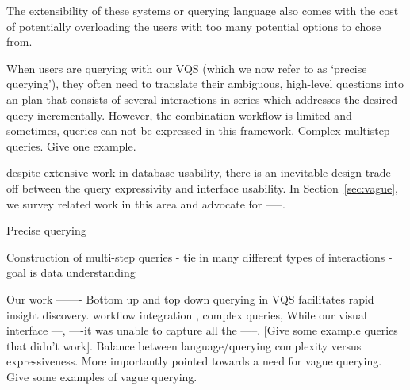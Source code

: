 The extensibility of these systems or querying language also comes with the cost of potentially overloading the users with too many potential options to chose from. 

\par When users are querying with our VQS (which we now refer to as `precise querying'), they often need to translate their ambiguous, high-level questions into an plan that consists of several interactions in series which addresses the desired query incrementally. However, the combination workflow is limited and sometimes, queries can not be expressed in this framework. Complex multistep queries. Give one example. 
\par despite extensive work in database usability, there is an inevitable design trade-off between the query expressivity and interface usability\cite{Morton2014,Jagadish2007}. In Section~\ref{sec:vague}, we survey related work in this area and advocate for -----. 


Precise querying 

Construction of multi-step queries
- tie in many different types of interactions
- goal is data understanding 

\par Our \zv work ------- Bottom up and top down querying in VQS facilitates rapid insight discovery. 
workflow integration , complex queries,
While our visual interface ---, ----it was unable to capture all the -----. [Give some example queries that didn't work]. Balance between language/querying complexity versus expressiveness. More importantly pointed towards a need for vague querying. Give some examples of vague querying.

